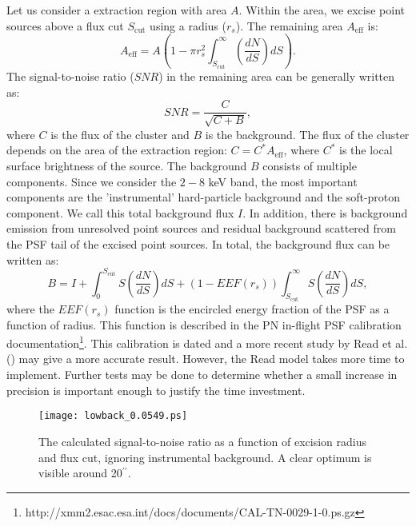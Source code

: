 \documentclass[10pt,a4paper]{article}
\begin{document}
Let us consider a extraction region with area $A$. Within the area, we excise point sources above a flux cut $S_{\mathrm{cut}}$ using a radius ($r_s$). The remaining area $A_{\mathrm{eff}}$ is:
\begin{equation}
A_{\mathrm{eff}} = A \left( 1 - \pi r_s^2 \int_{S_{\mathrm{cut}}}^{\infty} \left(\frac{dN}{dS}\right) dS \right).
\end{equation}   
The signal-to-noise ratio ($SNR$) in the remaining area can be generally written as:
\begin{equation}
SNR = \frac{C}{\sqrt{C + B}},
\label{eq:snr}
\end{equation}
where $C$ is the flux of the cluster and $B$ is the background. The flux of the cluster depends on the area of the extraction region: $C = C^{*} A_{\mathrm{eff}}$, where $C^{*}$ is the local surface brightness of the source. The background $B$ consists of multiple components. Since we consider the $2-8$ keV band, the most important components are the 'instrumental' hard-particle background and the soft-proton component. We call this total background flux $I$. In addition, there is background emission from unresolved point sources and residual background scattered from the PSF tail of the excised point sources. In total, the background flux can be written as:
\begin{equation}
B = I + \int_{0}^{S_{\mathrm{cut}}} S \left(\frac{dN}{dS}\right) dS + \left(1 - EEF(r_s)\right) \int_{S_{\mathrm{cut}}}^{\infty} S \left(\frac{dN}{dS}\right) dS,
\label{eq:backg} 
\end{equation}
where the $EEF(r_s)$ function is the encircled energy fraction of the PSF as a function of radius.
This function is described in the PN in-flight PSF calibration documentation\footnote{http://xmm2.esac.esa.int/docs/documents/CAL-TN-0029-1-0.ps.gz}. This calibration is dated and a more recent study by Read et al. (\cite{read2011}) may give a more accurate result. However, the Read model takes more time to implement. Further tests may be done to determine whether a small increase in precision is important enough to justify the time investment.

\begin{figure}[t]
\texttt{[image: lowback\_0.0549.ps]}
\caption{The calculated signal-to-noise ratio as a function of excision radius and flux 
cut, ignoring instrumental background. A clear optimum is visible around 20$^{\prime\prime}$.}
\label{fig:example}
\end{figure}
\end{document}
